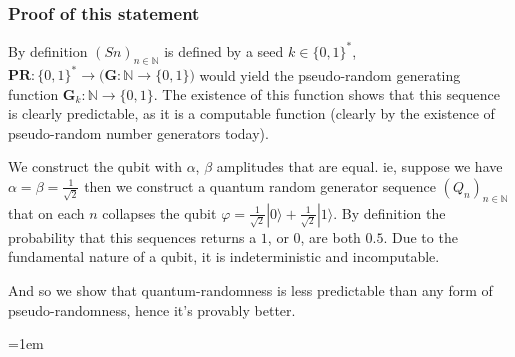\documentclass{article}
\begin{document}
\subsubsection*{Proof of this statement}
By definition $(Sn)_{n\in\mathbb{N}}$ is defined by a seed $k \in \{0,1\}^*$, $\bm{PR}: \{0,1\}^* \rightarrow \bigl(\bm{G}: \mathbb{N} \rightarrow \{0,1\}\bigr)$ would yield the pseudo-random generating function $\bm{G}_k: \mathbb{N} \rightarrow \{0,1\}$. The existence of this function shows that this sequence is clearly predictable, as it is a computable function (clearly by the existence of pseudo-random number generators today).

We construct the qubit with $\alpha$, $\beta$ amplitudes that are equal. ie, suppose we have $\alpha = \beta = \frac{1}{\sqrt{2}}$ then we construct a quantum random generator sequence $(Q_n)_{n \in \mathbb{N}}$ that on each $n$ collapses the qubit $\varphi = \frac{1}{\sqrt{2}} | 0\rangle + \frac{1}{\sqrt{2}} | 1\rangle$. By definition the probability that this sequences returns a $1$, or $0$, are both $0.5$. Due to the fundamental nature of a qubit, it is indeterministic and incomputable.

And so we show that quantum-randomness is less predictable than any form of pseudo-randomness, hence it's provably better.

\pagebreak
\emergencystretch=1em
\printbibliography
\end{document}

